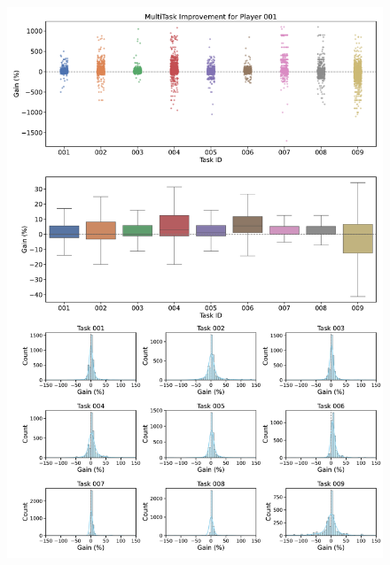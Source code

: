 \begin{figure}[ht]
  \centering
  \includegraphics[width=\textwidth]{figures/gain_validity/multitask/multitask_gain_player_00001.pdf}
\end{figure}
\clearpage

